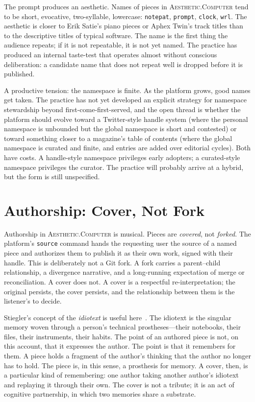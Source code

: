 \documentclass[10pt,letterpaper,twocolumn]{article}
\newcommand{\ac}{\textsc{Aesthetic.Computer}}
\begin{document}
The prompt produces an aesthetic. Names of pieces in \ac{} tend to be short, evocative, two-syllable, lowercase: \texttt{notepat}, \texttt{prompt}, \texttt{clock}, \texttt{wrl}. The aesthetic is closer to Erik Satie's piano pieces or Aphex Twin's track titles than to the descriptive titles of typical software. The name is the first thing the audience repeats; if it is not repeatable, it is not yet named. The practice has produced an internal taste-test that operates almost without conscious deliberation: a candidate name that does not repeat well is dropped before it is published.

A productive tension: the namespace is finite. As the platform grows, good names get taken. The practice has not yet developed an explicit strategy for namespace stewardship beyond first-come-first-served, and the open thread is whether the platform should evolve toward a Twitter-style handle system (where the personal namespace is unbounded but the global namespace is short and contested) or toward something closer to a magazine's table of contents (where the global namespace is curated and finite, and entries are added over editorial cycles). Both have costs. A handle-style namespace privileges early adopters; a curated-style namespace privileges the curator. The practice will probably arrive at a hybrid, but the form is still unspecified.

\section{Authorship: Cover, Not Fork}

Authorship in \ac{} is musical. Pieces are \emph{covered}, not \emph{forked}. The platform's \texttt{source} command hands the requesting user the source of a named piece and authorizes them to publish it as their own work, signed with their handle. This is deliberately not a Git fork. A fork carries a parent--child relationship, a divergence narrative, and a long-running expectation of merge or reconciliation. A cover does not. A cover is a respectful re-interpretation; the original persists, the cover persists, and the relationship between them is the listener's to decide.

Stiegler's concept of the \emph{idiotext} is useful here~\citep{stiegler1998technics,staunaes2021stiegler}. The idiotext is the singular memory woven through a person's technical prostheses---their notebooks, their files, their instruments, their habits. The point of an authored piece is not, on this account, that it expresses the author. The point is that it remembers for them. A piece holds a fragment of the author's thinking that the author no longer has to hold. The piece is, in this sense, a prosthesis for memory. A cover, then, is a particular kind of remembering: one author taking another author's idiotext and replaying it through their own. The cover is not a tribute; it is an act of cognitive partnership, in which two memories share a substrate.
\end{document}
